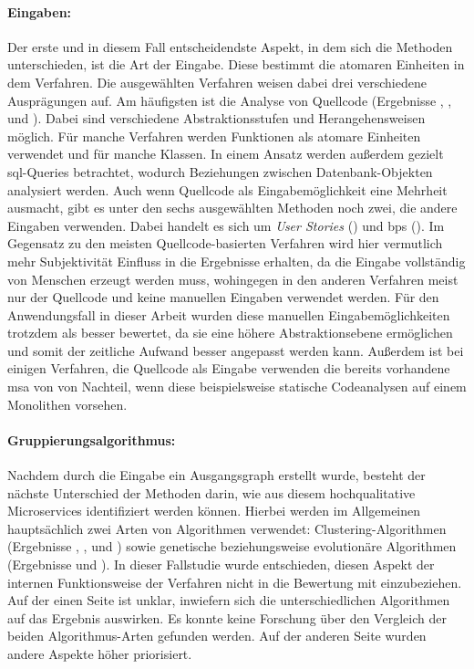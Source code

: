 \paragraph{Eingaben:} Der erste und in diesem Fall entscheidendste Aspekt, in dem sich die Methoden unterschieden, ist die Art der Eingabe.
Diese bestimmt die atomaren Einheiten in dem Verfahren.
Die ausgewählten Verfahren weisen dabei drei verschiedene Ausprägungen auf.
Am häufigsten ist die Analyse von Quellcode (Ergebnisse , ,  und ).
Dabei sind verschiedene Abstraktionsstufen und Her\-an\-ge\-hens\-wei\-sen möglich.
Für manche Verfahren werden Funktionen als atomare Einheiten verwendet und für manche Klassen.
In einem Ansatz werden außerdem gezielt \gls{sql}-Queries betrachtet, wodurch Beziehungen zwischen Datenbank-Objekten analysiert werden.
Auch wenn Quellcode als Eingabemöglichkeit eine Mehrheit ausmacht, gibt es unter den sechs ausgewählten Methoden noch zwei, die andere Eingaben verwenden.
Dabei handelt es sich um \emph{User Stories} () und \glspl{bp} ().
Im Gegensatz zu den meisten Quellcode-basierten Verfahren wird hier vermutlich mehr Subjektivität Einfluss in die Ergebnisse erhalten, da die Eingabe vollständig von Menschen erzeugt werden muss, wohingegen in den anderen Verfahren meist nur der Quellcode und keine manuellen Eingaben verwendet werden.
Für den Anwendungsfall in dieser Arbeit wurden diese manuellen Eingabemöglichkeiten trotzdem als besser bewertet, da sie eine höhere Abstraktionsebene ermöglichen und somit der zeitliche Aufwand besser angepasst werden kann.
Außerdem ist bei einigen Verfahren, die Quellcode als Eingabe verwenden die bereits vorhandene \gls{msa} von \jf von Nachteil, wenn diese beispielsweise statische Codeanalysen auf einem Monolithen vorsehen.

\paragraph{Gruppierungsalgorithmus:} Nachdem durch die Eingabe ein Ausgangsgraph erstellt wurde, besteht der nächste Unterschied der Methoden darin, wie aus diesem hochqualitative Microservices identifiziert werden können.
Hierbei werden im Allgemeinen hauptsächlich zwei Arten von Algorithmen verwendet: Clustering-Algorithmen (Ergebnisse , ,  und ) sowie genetische beziehungsweise evolutionäre Algorithmen (Ergebnisse  und ).
In dieser Fallstudie wurde entschieden, diesen Aspekt der internen Funktionsweise der Verfahren nicht in die Bewertung mit einzubeziehen.
Auf der einen Seite ist unklar, inwiefern sich die unterschiedlichen Algorithmen auf das Ergebnis auswirken.
Es konnte keine Forschung über den Vergleich der beiden Algorithmus-Arten gefunden werden.
Auf der anderen Seite wurden andere Aspekte höher priorisiert.

